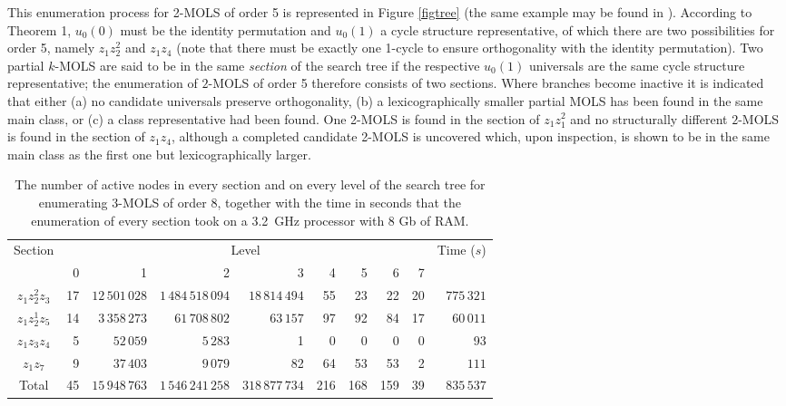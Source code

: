 This enumeration process for 2-MOLS of order 5 is represented  in Figure \ref{figtree} (the same example may be found in \cite{Kidd2012}).  According to Theorem 1, $u_0{(0)}$ must be the identity permutation and $u_0{(1)}$ a cycle structure representative, of which there are two possibilities for order 5, namely $z_1z_2^2$ and $z_1z_4$ (note that there must be exactly one 1-cycle to ensure orthogonality with the identity permutation).  Two partial $k$-MOLS are said to be in the same \emph{section} of the search tree if the respective $u_0{(1)}$ universals are the same cycle structure representative; the enumeration of $2$-MOLS of order 5 therefore consists of two sections.
Where branches become inactive it is indicated that either (a) no candidate universals preserve orthogonality,  (b) a lexicographically smaller partial MOLS has been found in the same main class, or   (c) a class representative had been found. 
One 2-MOLS is found in the section of $z_1z_1^2$ and no structurally different $2$-MOLS is found  in the section of $z_1z_4$,  although a completed candidate 2-MOLS is uncovered which, upon inspection, is shown to be in the same main class  as the first one but lexicographically larger.
  \begin{table}[b]
 \centering
\begin{tabular}{crrrrrrrrr}
\toprule
Section& \multicolumn{8}{c}{Level}& Time ($s$)\\
\cmidrule(lr){2-9}
 & 0 & 1 & 2 & 3 & 4 & 5 & 6 & 7 &   \\ \midrule 
$z_1z_2^2z_3$ &17 & $12\,501\,028$ & $1\,484\,518\,094$ & $18\,814\,494$ & 55 & 23 & 22 & 20 & $775\,321$ \\ 
$z_1z_2^1z_5$ &14 & $3\,358\,273$ & $61\,708\,802$ & $63\,157$ & 97 & 92 & 84 & 17 & $60\,011$ \\ 
$z_1z_3z_4$ &5 & $52\,059$ & $5\,283$ & 1 & 0 & 0 & 0 & 0 & 93 \\ 
$z_1z_7$ &9 & $37\,403$ & $9\,079$ & 82 & 64 & 53 & 53 & 2 & $111$ \\ \midrule
Total &45 & $15\,948\,763$ & $1\,546\,241\,258$ & $318\,877\,734$ & 216 & 168 & 159 & 39 & $835\,537$ \\ \bottomrule
\end{tabular}\vspace*{.4cm}
\caption{The number of active nodes in every section and on every level of the search tree for enumerating   3-MOLS of order 8, together with the time in seconds that the enumeration of every section took on a 3.2~GHz processor with 8 Gb of RAM.}
\label{83}
\end{table}
